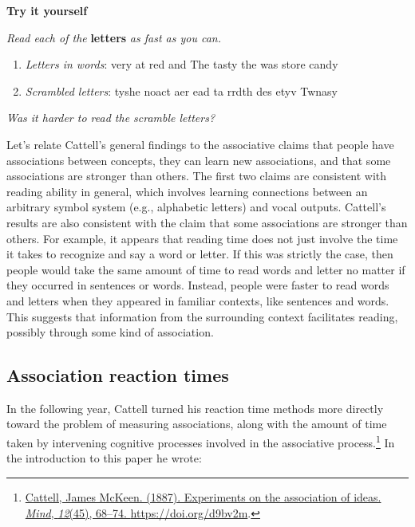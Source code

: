 \documentclass[
  oneside,
  12pt]{crumpbook}
\newenvironment{floatrightbox50}{%
  \wrapfigure{R}{.5\textwidth}%
  }{%
  \endwrapfigure}
\begin{document}
\begin{floatrightbox50}
\textbf{Try it yourself}

\emph{Read each of the} \textbf{letters} \emph{as fast as you can.}

\begin{enumerate}
\def\labelenumi{\arabic{enumi}.}
\item
  \emph{Letters in words}: very at red and The tasty the was store candy
\item
  \emph{Scrambled letters}: tyshe noact aer ead ta rrdth des etyv Twnasy
\end{enumerate}

\emph{Was it harder to read the scramble letters?}

\end{floatrightbox50}

Let's relate Cattell's general findings to the associative claims that people have associations between concepts, they can learn new associations, and that some associations are stronger than others. The first two claims are consistent with reading ability in general, which involves learning connections between an arbitrary symbol system (e.g., alphabetic letters) and vocal outputs. Cattell's results are also consistent with the claim that some associations are stronger than others. For example, it appears that reading time does not just involve the time it takes to recognize and say a word or letter. If this was strictly the case, then people would take the same amount of time to read words and letter no matter if they occurred in sentences or words. Instead, people were faster to read words and letters when they appeared in familiar contexts, like sentences and words. This suggests that information from the surrounding context facilitates reading, possibly through some kind of association.

\hypertarget{association-reaction-times}{%
\subsection{Association reaction times}\label{association-reaction-times}}

In the following year, Cattell turned his reaction time methods more directly toward the problem of measuring associations, along with the amount of time taken by intervening cognitive processes involved in the associative process.\footnote{\protect\hyperlink{ref-cattellExperimentsAssociationIdeas1887}{Cattell, James McKeen. (1887). Experiments on the association of ideas. \emph{Mind}, \emph{12}(45), 68--74. \url{https://doi.org/d9bv2m}}.} In the introduction to this paper he wrote:
\end{document}
